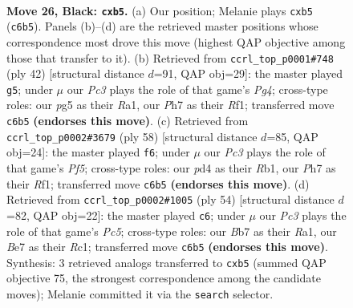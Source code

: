 \documentclass[11pt]{article}
\begin{document}
\clearpage

\begin{figure}[p]\centering
\begin{subfigure}{0.46\textwidth}\centering
\resizebox{\linewidth}{!}{%
\newchessgame
\chessboard[
  setfen={r1r2k2/pb1qb2p/n1p3pP/1P1p1pP1/3P1P2/1P2P1N1/8/R2QKBNR b KQ - 0 26},
  showmover=false,
  pgfstyle=straightmove, color=movearrow, markmove={c6-b5}
]}
\caption{}
\end{subfigure}\hfill
\begin{subfigure}{0.46\textwidth}\centering
\resizebox{\linewidth}{!}{%
\newchessgame
\chessboard[
  setfen={2rq2k1/1p1nbr2/4p1p1/p1pp1p2/P2P2PP/2P1B3/1P2BPK1/R2Q1R2 w - - 0 22},
  showmover=false,
  pgfstyle=straightmove, color=movearrow, markmove={g4-g5}
]}
\caption{}
\end{subfigure}
\\[4pt]
\begin{subfigure}{0.46\textwidth}\centering
\resizebox{\linewidth}{!}{%
\newchessgame
\chessboard[
  setfen={1rb1r1kb/3n1p1p/1q1p2p1/1ppP1PB1/1P2P1P1/7P/3QN1BK/1R3R2 w - - 5 30},
  showmover=false,
  pgfstyle=straightmove, color=movearrow, markmove={f5-f6}
]}
\caption{}
\end{subfigure}\hfill
\begin{subfigure}{0.46\textwidth}\centering
\resizebox{\linewidth}{!}{%
\newchessgame
\chessboard[
  setfen={2r1brk1/p3q3/Pp2p3/1PPpPn1p/5Pp1/2Q1p3/1B2B1PP/R1R3K1 w - - 0 28},
  showmover=false,
  pgfstyle=straightmove, color=movearrow, markmove={c5-c6}
]}
\caption{}
\end{subfigure}
\caption{\textbf{Move 26, Black: \texttt{cxb5}.} (a) Our position; Melanie plays \texttt{cxb5} (\texttt{c6b5}). Panels (b)--(d) are the retrieved master positions whose correspondence most drove this move (highest QAP objective among those that transfer to it). (b) Retrieved from \texttt{ccrl\_top\_p0001\#748} (ply 42) [structural distance $d$=91, QAP obj=29]: the master played \texttt{g5}; under $\mu$ our \emph{Pc3} plays the role of that game's \emph{Pg4}; cross-type roles: our \emph{p}g5 as their \emph{R}a1, our \emph{P}h7 as their \emph{R}f1; transferred move \texttt{c6b5} \textbf{(endorses this move)}. (c) Retrieved from \texttt{ccrl\_top\_p0002\#3679} (ply 58) [structural distance $d$=85, QAP obj=24]: the master played \texttt{f6}; under $\mu$ our \emph{Pc3} plays the role of that game's \emph{Pf5}; cross-type roles: our \emph{p}d4 as their \emph{R}b1, our \emph{P}h7 as their \emph{R}f1; transferred move \texttt{c6b5} \textbf{(endorses this move)}. (d) Retrieved from \texttt{ccrl\_top\_p0002\#1005} (ply 54) [structural distance $d$=82, QAP obj=22]: the master played \texttt{c6}; under $\mu$ our \emph{Pc3} plays the role of that game's \emph{Pc5}; cross-type roles: our \emph{B}b7 as their \emph{R}a1, our \emph{B}e7 as their \emph{R}c1; transferred move \texttt{c6b5} \textbf{(endorses this move)}. Synthesis: 3 retrieved analogs transferred to \texttt{cxb5} (summed QAP objective 75, the strongest correspondence among the candidate moves); Melanie committed it via the \texttt{search} selector.}
\label{fig:thought-m51}
\end{figure}
\end{document}
